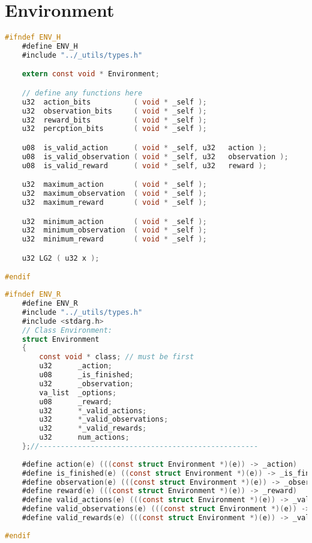 \documentclass[fancychapters]{report}   	%
\begin{document}
\section{Environment}
\begin{lstlisting}[language=C,caption={environment.h}]
#ifndef ENV_H
    #define ENV_H
    #include "../_utils/types.h"

    extern const void * Environment;

    // define any functions here
    u32  action_bits          ( void * _self );
    u32  observation_bits     ( void * _self );
    u32  reward_bits          ( void * _self );
    u32  percption_bits       ( void * _self );

    u08  is_valid_action      ( void * _self, u32   action );
    u08  is_valid_observation ( void * _self, u32   observation );
    u08  is_valid_reward      ( void * _self, u32   reward );

    u32  maximum_action       ( void * _self );
    u32  maximum_observation  ( void * _self );
    u32  maximum_reward       ( void * _self );

    u32  minimum_action       ( void * _self );
    u32  minimum_observation  ( void * _self );
    u32  minimum_reward       ( void * _self );

    u32 LG2 ( u32 x );

#endif
\end{lstlisting}
\begin{lstlisting}[language=C,caption={environment.r}]
#ifndef ENV_R
    #define ENV_R
    #include "../_utils/types.h"
    #include <stdarg.h>
    // Class Environment:
    struct Environment
    {
        const void * class; // must be first
        u32      _action;
        u08      _is_finished;
        u32      _observation;
        va_list  _options;
        u08      _reward;
        u32      *_valid_actions;
        u32      *_valid_observations;
        u32      *_valid_rewards;
        u32      num_actions;
    };//---------------------------------------------------
    
    #define action(e) (((const struct Environment *)(e)) -> _action)
    #define is_finished(e) ((const struct Environment *)(e)) -> _is_finished
    #define observation(e) (((const struct Environment *)(e)) -> _observation)
    #define reward(e) (((const struct Environment *)(e)) -> _reward)
    #define valid_actions(e) (((const struct Environment *)(e)) -> _valid_actions)
    #define valid_observations(e) (((const struct Environment *)(e)) -> _valid_observations)
    #define valid_rewards(e) (((const struct Environment *)(e)) -> _valid_rewards)
    
#endif
\end{lstlisting}
\end{document}
